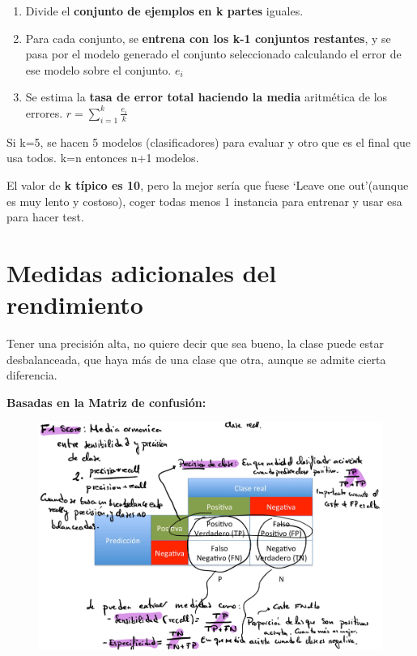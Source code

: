 \documentclass[12pt]{report} %
\begin{document}
\begin{enumerate}
\def\labelenumi{\arabic{enumi}.}

\item
  Divide el \textbf{conjunto de ejemplos en k partes} iguales.
\item
  Para cada conjunto, se \textbf{entrena con los k-1 conjuntos
  restantes}, y se pasa por el modelo generado el conjunto seleccionado
  calculando el error de ese modelo sobre el conjunto. \(e_i\)
\item
  Se estima la \textbf{tasa de error total haciendo la media} aritmética
  de los errores. \(r= \sum_{i=1}^k \frac {e_i}{k}\)
\end{enumerate}

Si k=5, se hacen 5 modelos (clasificadores) para evaluar y otro que es
el final que usa todos. k=n entonces n+1 modelos.

El valor de \textbf{k típico es 10}, pero la mejor sería que fuese
`Leave one out'(aunque es muy lento y costoso), coger todas menos 1
instancia para entrenar y usar esa para hacer test.

\section{Medidas adicionales del
rendimiento}

Tener una precisión alta, no quiere decir que sea bueno, la clase puede
estar desbalanceada, que haya más de una clase que otra, aunque se
admite cierta diferencia.

\textbf{Basadas en la Matriz de confusión:}

\begin{figure}[H]
	{\includegraphics[scale=.2]{Untitled 11.png}}
\end{figure}
\end{document}
